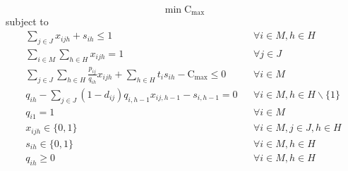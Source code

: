 \documentclass[a4paper,11pt]{article}
\begin{document}
\begin{equation}\label{eq:fo_mod1}
	\min \text{C}_{\max}
\end{equation}
\qquad subject to
\begin{eqnarray}	
\label{eq:uniqueAct_mod1} \sum_{j \in J}{x_{ijh}} +  s_{ih} \leq 1 && \forall i \in M, h \in H \\
\label{eq:mandJob_mod1}	 \sum_{i \in M}\sum_{h \in H}{x_{ijh}} = 1 && \forall j \in J \\ 
\label{eq:cMax_mod1} \sum_{j \in J}\sum_{h \in H}{\frac{p_{ij}}{q_{ih}}x_{ijh}} + \sum_{h \in H}{t_i} s_{ih} - \text{C}_{\max} \leq 0 && \forall i \in M \\ 
\label{eq:det_mod1}	q_{ih} - \sum_{j \in J}(1-d_{ij})q_{i,h-1}x_{ij,h-1} - s_{i,h-1} = 0 && \forall i \in M, h \in H\backslash\{1\} \\ 
\label{eq:qInit_mod1} q_{i1} = 1 && \forall i \in M \\ 
\label{eq:xDef_mod1} x_{ijh} \in \{0,1\} && \forall i \in M, j \in J, h \in H \\ 
\label{eq:dDef_mod1} s_{ih} \in \{0,1\} && \forall i \in M, h \in H \\ 
\label{eq:qDef_mod1} q_{ih} \geq 0 && \forall  i \in M, h \in H
\end{eqnarray}
\end{document}
